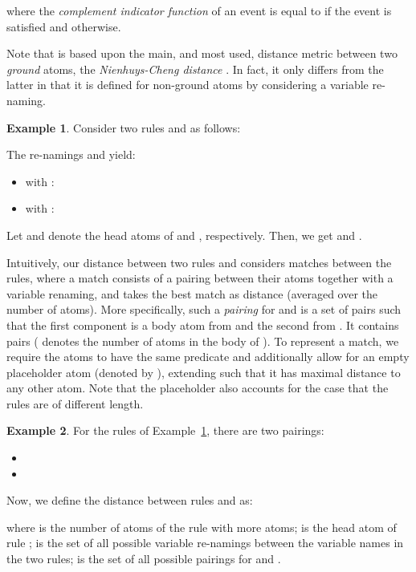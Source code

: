 \documentclass[letterpaper]{article} \usepackage{aaai20}  \usepackage{times}  \usepackage{helvet} \usepackage{courier}  \usepackage[hyphens]{url}  \usepackage{graphicx} \urlstyle{rm} \def\UrlFont{\rm}  \usepackage{graphicx}  \frenchspacing  \setlength{\pdfpagewidth}{8.5in}  \setlength{\pdfpageheight}{11in}  \usepackage{amsthm}
\theoremstyle{definition}
\newtheorem{example}{Example}[section]
\begin{document}
where the \emph{complement indicator function}  of an event  is equal to  if the event is satisfied and  otherwise.

Note that  is based upon the main, and most used, distance metric between two \emph{ground} atoms, the \emph{Nienhuys-Cheng distance} \cite{Nienhuys_Cheng_distance}. In fact, it only differs from the latter in that it is defined for non-ground atoms by considering a variable re-naming.


\begin{example}\label{ex:1}
Consider two rules  and  as follows:

The re-namings 
 and  yield:
\begin{itemize}
\item[1)]  with : 
\item[2)]  with : 
\end{itemize}
Let  and  denote the head atoms of  and , respectively. Then, we get 
 and .
\end{example}


Intuitively, our distance  between two rules  and  considers matches between the rules, where a match consists of a pairing between their atoms together with a variable renaming, and takes the best match as distance (averaged over the number of atoms).
More specifically, such a \emph{pairing} for  and  is a set of pairs such that the first component is a body atom from  and the second from . It contains  pairs ( denotes the number of atoms in the body of ). 
To represent a match, we require the atoms to have the same predicate and additionally allow for an empty placeholder atom (denoted by ), extending  such that it has maximal distance  to any other atom. Note that the placeholder also accounts for the case that the rules are of different length. 


\begin{example}
For the rules of Example~\ref{ex:1}, there are two pairings: 
\begin{itemize}
\item[a)]   
\item[b)]
\end{itemize}
\end{example}

Now, we define the distance  between rules  and 
as:

where
 is the number of atoms of the rule with more atoms;
 is the head atom of rule ;
 is the set of all possible variable re-namings between the variable names in the two rules;
 is the set of all possible pairings for  and . 
\end{document}
